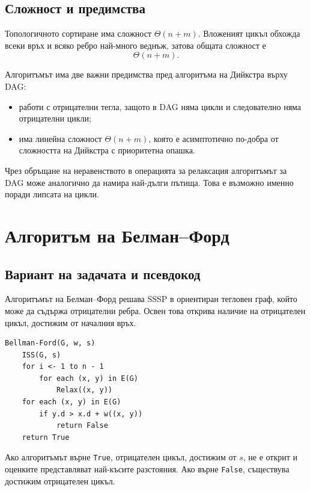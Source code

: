 \subsection{Сложност и предимства}\label{s:8.4.3}

Топологичното сортиране има сложност $\Theta(n+m)$. Вложеният цикъл обхожда всеки връх и всяко ребро най-много веднъж, затова общата сложност е
\[
\Theta(n+m).
\]

Алгоритъмът има две важни предимства пред алгоритъма на Дийкстра върху DAG:

\begin{itemize}
\item работи с отрицателни тегла, защото в DAG няма цикли и следователно няма отрицателни цикли;
\item има линейна сложност $\Theta(n+m)$, която е асимптотично по-добра от сложността на Дийкстра с приоритетна опашка.
\end{itemize}

\begin{remark}
Чрез обръщане на неравенството в операцията за релаксация алгоритъмът за DAG може аналогично да намира най-дълги пътища. Това е възможно именно поради липсата на цикли.
\end{remark}

\section{Алгоритъм на Белман--Форд}\label{s:8.5}

\subsection{Вариант на задачата и псевдокод}\label{s:8.5.1}

Алгоритъмът на Белман--Форд решава SSSP в ориентиран тегловен граф, който може да съдържа отрицателни ребра. Освен това открива наличие на отрицателен цикъл, достижим от началния връх.

\begin{verbatim}
Bellman-Ford(G, w, s)
    ISS(G, s)
    for i <- 1 to n - 1
        for each (x, y) in E(G)
            Relax((x, y))
    for each (x, y) in E(G)
        if y.d > x.d + w((x, y))
            return False
    return True
\end{verbatim}

Ако алгоритъмът върне \texttt{True}, отрицателен цикъл, достижим от $s$, не е открит и оценките представляват най-късите разстояния. Ако върне \texttt{False}, съществува достижим отрицателен цикъл.

